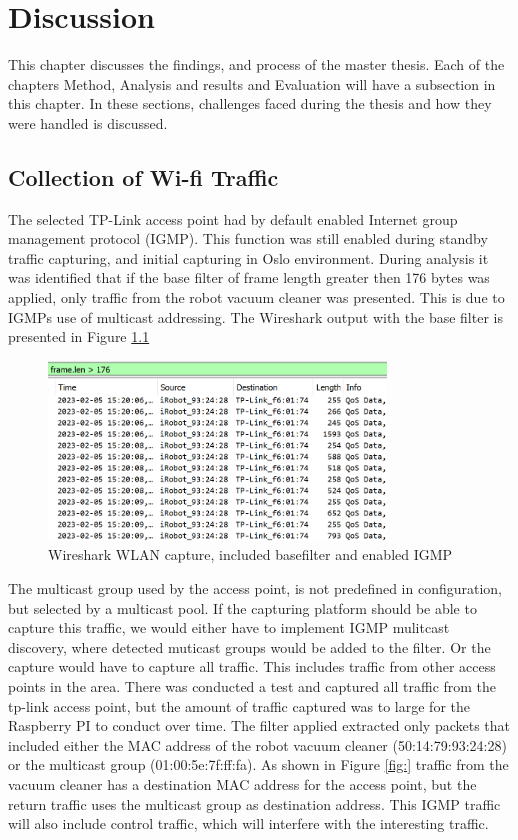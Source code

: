 \chapter{Discussion}
This chapter discusses the findings, and process of the master thesis. Each of the chapters Method, Analysis and results and Evaluation will have a subsection in this chapter. In these sections, challenges faced during the thesis and how they were handled is discussed.

\section{Collection of Wi-fi Traffic}
The selected TP-Link access point had by default enabled Internet group management protocol (IGMP). This function was still enabled during standby traffic capturing, and initial capturing in Oslo environment. During analysis it was identified that if the base filter of frame length greater then 176 bytes was applied, only traffic from the robot vacuum cleaner was presented. This is due to IGMPs use of multicast addressing. The Wireshark output with the base filter is presented in Figure \ref{fig:WLANIGMP_enabled}

\begin{figure}[H]
    \centering
    \includegraphics[width=0.8\textwidth]{figures/WLAN_IGMP_enabled.png}
    \caption{Wireshark WLAN capture, included basefilter and enabled IGMP}
    \label{fig:WLANIGMP_enabled}
\end{figure}

The multicast group used by the access point, is not predefined in configuration, but selected by a multicast pool. If the capturing platform should be able to capture this traffic, we would either have to implement IGMP mulitcast discovery, where detected muticast groups would be added to the filter. Or the capture would have to capture all traffic. This includes traffic from other access points in the area. There was conducted a test and captured all traffic from the tp-link access point, but the amount of traffic captured was to large for the Raspberry PI to conduct over time. The filter applied extracted only packets that included either the MAC address of the robot vacuum cleaner (50:14:79:93:24:28) or the multicast group (01:00:5e:7f:ff:fa). As shown in Figure \ref{fig:} traffic from the vacuum cleaner has a destination MAC address for the access point, but the return traffic uses the multicast group as destination address. This IGMP traffic will also include control traffic, which will interfere with the interesting traffic. 


